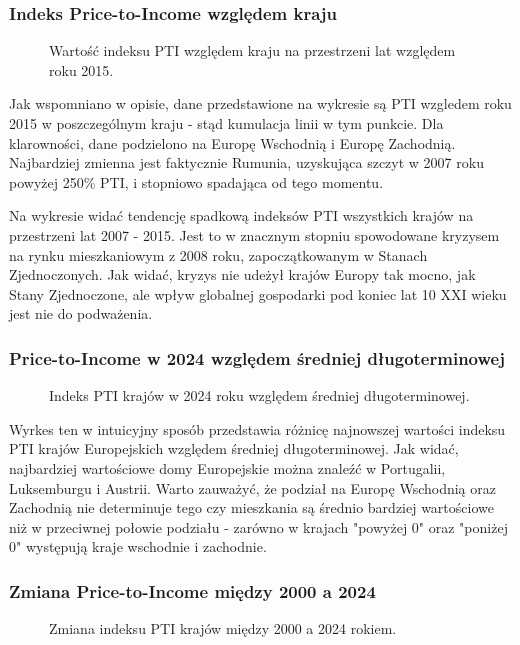 \documentclass[12pt]{article}
\begin{document}
\subsubsection{Indeks Price-to-Income względem kraju}
\begin{figure}[H]
    
    \caption{Wartość indeksu PTI względem kraju na przestrzeni lat względem roku 2015.}
\end{figure}

Jak wspomniano w opisie, dane przedstawione na wykresie są PTI wzgledem roku 2015 w poszczególnym kraju - stąd kumulacja linii w tym punkcie.
Dla klarowności, dane podzielono na Europę Wschodnią i Europę Zachodnią. Najbardziej zmienna jest faktycznie Rumunia, uzyskująca szczyt w 2007 roku 
powyżej 250\% PTI, i stopniowo spadająca od tego momentu.

Na wykresie widać tendencję spadkową indeksów PTI wszystkich krajów na przestrzeni lat 2007 - 2015. Jest to w znacznym stopniu spowodowane
kryzysem na rynku mieszkaniowym z 2008 roku, zapoczątkowanym w Stanach Zjednoczonych. Jak widać, kryzys nie udeżył krajów Europy tak mocno, 
jak Stany Zjednoczone, ale wpływ globalnej gospodarki pod koniec lat 10 XXI wieku jest nie do podważenia.

\subsubsection{Price-to-Income w 2024 względem średniej długoterminowej}
\begin{figure}[H]
    
    \caption{Indeks PTI krajów w 2024 roku względem średniej długoterminowej.}
\end{figure}

Wyrkes ten w intuicyjny sposób przedstawia różnicę najnowszej wartości indeksu PTI krajów Europejskich względem średniej długoterminowej.
Jak widać, najbardziej wartościowe domy Europejskie można znaleźć w Portugalii, Luksemburgu i Austrii. Warto zauważyć, że podział na Europę Wschodnią 
oraz Zachodnią nie determinuje tego czy mieszkania są średnio bardziej wartościowe niż w przeciwnej połowie podziału - zarówno w krajach "powyżej 0" 
oraz "poniżej 0" występują kraje wschodnie i zachodnie.  

\subsubsection{Zmiana Price-to-Income między 2000 a 2024}
\begin{figure}[H]
    
    \caption{Zmiana indeksu PTI krajów między 2000 a 2024 rokiem.}
\end{figure}
\end{document}
